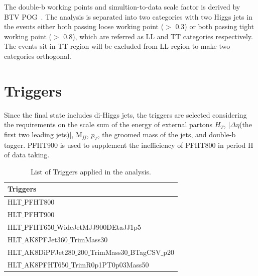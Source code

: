 The double-b working points and simultion-to-data scale factor is derived by BTV POG~\citep{BtagRecommendation80XReReco}.
The analysis is separated into two categories with two Higgs jets in the events either both passing loose working point ($>$ 0.3) or both passing tight working point ($>$ 0.8), which are referred as LL and TT categories respectively. The events sit in TT region will be excluded from LL region to make two categories orthogonal.



\section{Triggers} \label{Triggers}
Since the final state includes di-Higgs jets, the triggers are selected considering the requirements on the scale sum of the energy of external partons $H_T$, |$\Delta \eta $(the first two leading jets)|, M$_{jj}$, $p_T$, the groomed mass of the jets, and double-b tagger. PFHT900 is used to supplement the inefficiency of PFHT800 in period H of data taking.
\begin{table}[h!]
  \begin{center}
    \begin{tabular}{l}
    Triggers \\
    \hline
    HLT$\_$PFHT800 \\
    HLT$\_$PFHT900 \\
    HLT$\_$PFHT650$\_$WideJetMJJ900DEtaJJ1p5 \\
    HLT$\_$AK8PFJet360$\_$TrimMass30 \\
    HLT$\_$AK8DiPFJet280$\_$200$\_$TrimMass30$\_$BTagCSV$\_$p20 \\
    HLT$\_$AK8PFHT650$\_$TrimR0p1PT0p03Mass50 \\
    \hline
    \end{tabular}
  \end{center}

  \caption{List of Triggers applied in the analysis.}
\end{table} 

